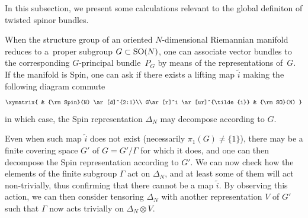 \documentclass[10pt,a4paper]{amsart}
\numberwithin{equation}{section}
\begin{document}
In this subsection, we present some calculations relevant to the global def\/initon of twisted spinor bundles.

When the structure group of an oriented $N$-dimensional Riemannian manifold reduces to a~proper subgroup $G\subset {\rm SO}(N)$, one can associate vector bundles to the corresponding $G$-principal bundle~$P_G$ by means of the representations of~$G$. If the manifold is Spin, one can ask if there exists a lifting map $\tilde{i}$ making the following diagram commute
\begin{gather*}
\xymatrix{
 & {\rm Spin}(N) \ar[d]^{2:1}\\
G\ar[r]^i \ar[ur]^{\tilde{i}} & {\rm SO}(N)
}
\end{gather*}
in which case, the Spin representation $\Delta_N$ may decompose according to $G$.

Even when such map $\tilde{i}$ does not exist (necessarily $\pi_1(G)\not= \{1\}$), there may be a f\/inite covering space $G'$ of $G=G'/\Gamma$ for which it does, and one can then decompose the Spin representation according to $G'$. We can now check how the elements of the f\/inite subgroup $\Gamma$ act on $\Delta_N$, and at least some of them will act non-trivially, thus conf\/irming that there cannot be a map $\tilde{i}$. By observing this action, we can then consider tensoring $\Delta_N$ with another representation $V$ of $G'$ such that $\Gamma$ now acts trivially on $\Delta_N\otimes V$.
\end{document}

